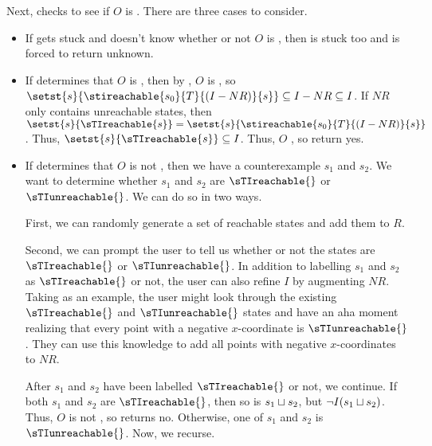 Next, \Helper{} checks to see if $O$ is . There are three
cases to consider.
\begin{itemize}
  \item
    If \IsIclosed{} gets stuck and doesn't know whether or not $O$ is
    , then \Helper{} is stuck too and is forced to return
    unknown.

  \item
    If \IsIclosed{} determines that $O$ is , then by
    , $O$ is , so
    $
      \setst{s}{\stireachable{s_0}{T}{(I-NR)}{s}}
        \subseteq I - NR
        \subseteq I
    $.
    If $NR$ only contains unreachable states, then
    $
      \setst{s}{\sTIreachable{s}} = \setst{s}{\stireachable{s_0}{T}{(I-NR)}{s}}
    $.
    Thus,
    $
      \setst{s}{\sTIreachable{s}} \subseteq I
    $.
    Thus, $O$ \sTIconfluent{}, so \Helper{} return yes.

  \item
    If \IsIclosed{} determines that $O$ is not , then we
    have a counterexample $s_1$ and $s_2$. We want to determine whether $s_1$
    and $s_2$ are $\sTIreachable{}$ or $\sTIunreachable{}$. We can do so in two
    ways.

    First, we can randomly generate a set of reachable states and add them to
    $R$.

    Second, we can prompt the user to tell us whether or not the states are
    $\sTIreachable{}$ or $\sTIunreachable{}$. In addition to labelling $s_1$
    and $s_2$ as $\sTIreachable{}$ or not, the user can also refine $I$ by
    augmenting $NR$. Taking  as an example,
    the user might look through the existing $\sTIreachable{}$ and
    $\sTIunreachable{}$ states and have an aha moment realizing that every
    point with a negative $x$-coordinate is $\sTIunreachable{}$. They can use
    this knowledge to add all points with negative $x$-coordinates to $NR$.

    After $s_1$ and $s_2$ have been labelled $\sTIreachable{}$ or not, we
    continue. If both $s_1$ and $s_2$ are $\sTIreachable{}$, then so is $s_1
    \sqcup s_2$, but $\lnot I(s_1 \sqcup s_2)$. Thus, $O$ is not \sTIconfluent{},
    so \Helper{} returns no. Otherwise, one of $s_1$ and $s_2$ is
    $\sTIunreachable{}$. Now, we recurse.
\end{itemize}




